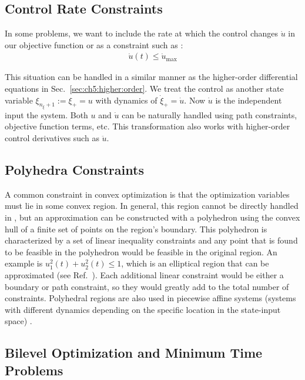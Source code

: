 \subsection{Control Rate Constraints}

In some problems, we want to include the rate at which the control changes $\dot{u}$ in our objective function or as a constraint such as \cite{Biegler2010a}:
\begin{align}
\dot{u}(t) \leq \dot{u}_{\max}
\end{align}

\noindent This situation can be handled in a similar manner as the higher-order differential equations in Sec.~\ref{sec:ch5:higher:order}.
We treat the control as another state variable $\xi_{n_\xi+1} := \xi_+ = u$ with dynamics of $\dot{\xi}_+ = \dot{u}$.
Now $\dot{u}$ is the independent input the system.
Both $u$ and $\dot{u}$ can be naturally handled using path constraints, objective function terms, etc.
This transformation also works with higher-order control derivatives such as $\ddot{u}$.

\subsection{Polyhedra Constraints} \label{sec:ch5:polyhedra}

A common constraint in convex optimization is that the optimization variables must lie in some convex region.
In general, this region cannot be directly handled in \lqdo{}, but an approximation can be constructed with a polyhedron using the convex hull of a finite set of points on the region's boundary.
This polyhedron is characterized by a set of linear inequality constraints and any point that is found to be feasible in the polyhedron would be feasible in the original region.
An example is $u_1^2(t) + u_2^2(t) \leq 1$, which is an elliptical region that can be approximated (see Ref.~\cite{matlab-elliptical}).
Each additional linear constraint would be either a boundary or path constraint, so they would greatly add to the total number of constraints.
Polyhedral regions are also used in piecewise affine systems (systems with different dynamics depending on the specific location in the state-input space) \cite{Borrelli2015a}.

\subsection{Bilevel Optimization and Minimum Time Problems} \label{sec:ch5:mtp}

